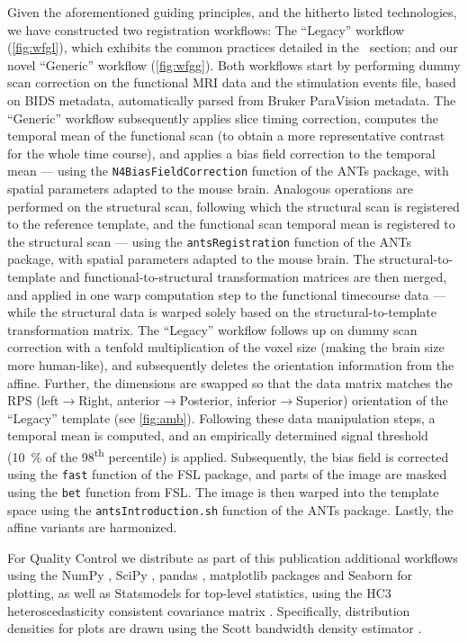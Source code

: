 Given the aforementioned guiding principles, and the hitherto listed technologies, we have constructed two registration workflows: The “Legacy” workflow (\cref{fig:wfgl}), which exhibits the common practices detailed in the ~section; and our novel “Generic” workflow (\cref{fig:wfgg}).
Both workflows start by performing dummy scan correction on the functional MRI data and the stimulation events file, based on BIDS metadata, automatically parsed from Bruker ParaVision metadata.
The “Generic” workflow subsequently applies slice timing correction, computes the temporal mean of the functional scan (to obtain a more representative contrast for the whole time course), and applies a bias field correction to the temporal mean --- using the \textcolor{mg}{\texttt{N4BiasFieldCorrection}} function of the ANTs package, with spatial parameters adapted to the mouse brain.
Analogous operations are performed on the structural scan, following which the structural scan is registered to the reference template, and the functional scan temporal mean is registered to the structural scan --- using the \textcolor{mg}{\texttt{antsRegistration}} function of the ANTs package, with spatial parameters adapted to the mouse brain.
The structural-to-template and functional-to-structural transformation matrices are then merged, and applied in one warp computation step to the functional timecourse data --- while the structural data is warped solely based on the structural-to-template transformation matrix. 
The “Legacy” workflow follows up on dummy scan correction with a tenfold multiplication of the voxel size (making the brain size more human-like), and subsequently deletes the orientation information from the affine.
Further, the dimensions are swapped so that the data matrix matches the RPS (left$\rightarrow$Right, anterior$\rightarrow$Posterior, inferior$\rightarrow$Superior) orientation of the “Legacy” template (see \cref{fig:amb}).
Following these data manipulation steps, a temporal mean is computed, and an empirically determined signal threshold (\SI{10}{\percent} of the 98\textsuperscript{th} percentile) is applied.
Subsequently, the bias field is corrected using the \textcolor{mg}{\texttt{fast}} function of the FSL package, and parts of the image are masked using the \textcolor{mg}{\texttt{bet}} function from FSL. 
The image is then warped into the template space using the \textcolor{mg}{\texttt{antsIntroduction.sh}} function of the ANTs package.
Lastly, the affine variants are harmonized.

For Quality Control we distribute as part of this publication additional workflows using the NumPy \cite{numpy}, SciPy \cite{scipy}, pandas \cite{pandas}, matplotlib packages \cite{matplotlib} and Seaborn \cite{seaborn} for plotting, as well as Statsmodels \cite{statsmodels} for top-level statistics, using the HC3 heteroscedasticity consistent covariance matrix \cite{long2000using}.
Specifically, distribution densities for plots are drawn using the Scott bandwidth density estimator \cite{Scott1979}.

